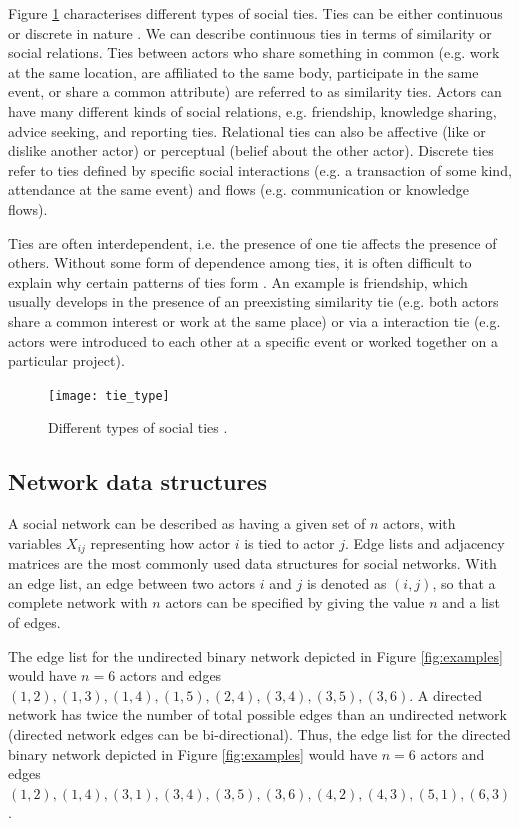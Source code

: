  Figure \ref{fig:tie_type} characterises different types of social ties. Ties can be either continuous or discrete in nature \citep{borgatti2013analyzing}. We can describe continuous ties in terms of similarity or social relations. Ties between actors who share something in common (e.g. work at the same location, are affiliated to the same body, participate in the same event, or share a common attribute) are referred to as similarity ties. Actors can have many different kinds of social relations, e.g. friendship, knowledge sharing, advice seeking, and reporting ties. Relational ties can also be affective (like or dislike another actor) or perceptual (belief about the other actor). Discrete ties refer to ties defined by specific social interactions (e.g. a transaction of some kind, attendance at the same event) and flows (e.g. communication or knowledge flows). \medskip

Ties are often interdependent, i.e. the presence of one tie affects the presence of others. Without some form of dependence among ties, it is often difficult to explain why certain patterns of ties form \citep{lusher2013exponential}. An example is friendship, which usually develops in the presence of an preexisting similarity tie (e.g. both actors share a common interest or work at the same place) or via a interaction tie (e.g. actors were introduced to each other at a specific event or worked together on a particular project). \medskip

\begin{figure}
	\centering
	\texttt{[image: tie\_type]}
	\caption{Different types of social ties \citep{borgatti2013analyzing}.}
	\label{fig:tie_type}
\end{figure}

\subsection{Network data structures}

A social network can be described as having a given set of $n$ actors, with variables $X_{ij}$ representing how actor $i$ is tied to actor $j$. Edge lists and adjacency matrices are the most commonly used data structures for social networks. With an edge list, an edge between two actors $i$ and $j$ is denoted as $(i,j)$, so that a complete network with $n$ actors can be specified by giving the value $n$ and a list of edges. \medskip

The edge list for the undirected binary network depicted in Figure \ref{fig:examples} would have $n = 6$ actors and edges $(1,2),(1,3),(1,4),(1,5),(2,4),(3,4),(3,5),(3,6)$. A directed network has twice the number of total possible edges than an undirected network (directed network edges can be bi\hyp{}directional). Thus, the edge list for the directed binary network depicted in Figure \ref{fig:examples} would have $n = 6$ actors and edges $(1,2),(1,4),(3,1),(3,4),(3,5),(3,6),(4,2),(4,3),(5,1),(6,3)$. \medskip

